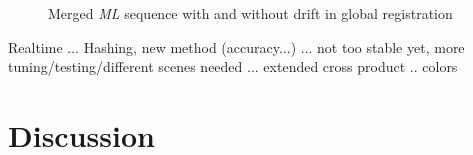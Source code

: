 \documentclass[10pt,twocolumn,letterpaper]{article}
\begin{document}
\begin{figure}
  \centering
  \caption{Merged \textit{ML} sequence with and without drift in global registration}
  \label{fig:globalregistration}
\end{figure}


Realtime ... Hashing, new method (accuracy...) ... not too stable yet, more tuning/testing/different scenes needed ... extended cross product .. colors

\section{Discussion}
\end{document}
